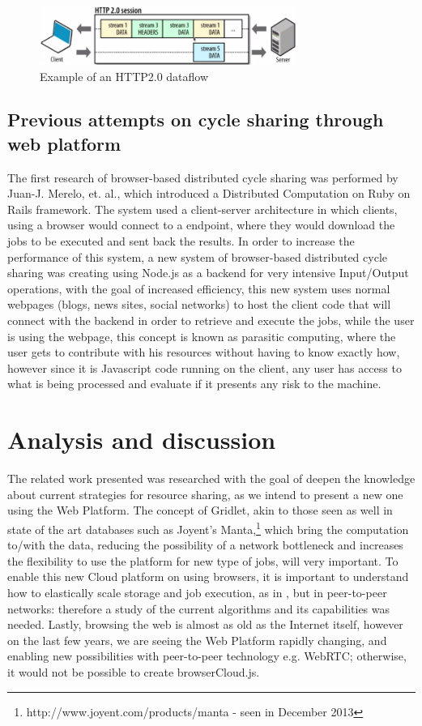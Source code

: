 \begin{figure}[hb]
  \centering
  \includegraphics[width=0.75\textwidth]{img/http2dataflow.png}
  \caption{Example of an HTTP2.0 dataflow}
  \label{fig:http2dataflow}
\end{figure}


\subsection{Previous attempts on cycle sharing through web platform}
The first research of browser-based distributed cycle sharing was performed by Juan-J. Merelo, et. al., which introduced a Distributed Computation on Ruby on Rails framework\cite{Merelo2007}. The system used a client-server architecture in which clients, using a browser would connect to a endpoint, where they would download the jobs to be executed and sent back the results. In order to increase the performance of this system, a new system\cite{Duda2013} of browser-based distributed cycle sharing was creating using Node.js as a backend for very intensive Input/Output operations\cite{Tilkov2010}, with the goal of increased efficiency, this new system uses normal webpages (blogs, news sites, social networks) to host the client code that will connect with the backend in order to retrieve and execute the jobs, while the user is using the webpage, this concept is known as parasitic computing\cite{Barabasi2001}, where the user gets to contribute with his resources without having to know exactly how, however since it is Javascript code running on the client, any user has access to what is being processed and evaluate if it presents any risk to the machine.

\section{Analysis and discussion}

The related work presented was researched with the goal of deepen the knowledge about current strategies for resource sharing, as we intend to present a new one using the Web Platform. The concept of Gridlet, akin to those seen as well in state of the art databases such as Joyent's Manta,\footnote{http://www.joyent.com/products/manta - seen in December 2013} which bring the computation to/with the data, reducing the possibility of a network bottleneck and increases the flexibility to use the platform for new type of jobs, will very important. To enable this new Cloud platform on using browsers, it is important to understand how to elastically scale storage and job execution, as in \cite{Silva2011}, but in peer-to-peer networks: therefore a study of the current algorithms and its capabilities was needed. Lastly, browsing the web is almost as old as the Internet itself, however on the last few years, we are seeing the Web Platform rapidly changing, and enabling new possibilities with peer-to-peer technology e.g. WebRTC; otherwise, it would not be possible to create browserCloud.js.


